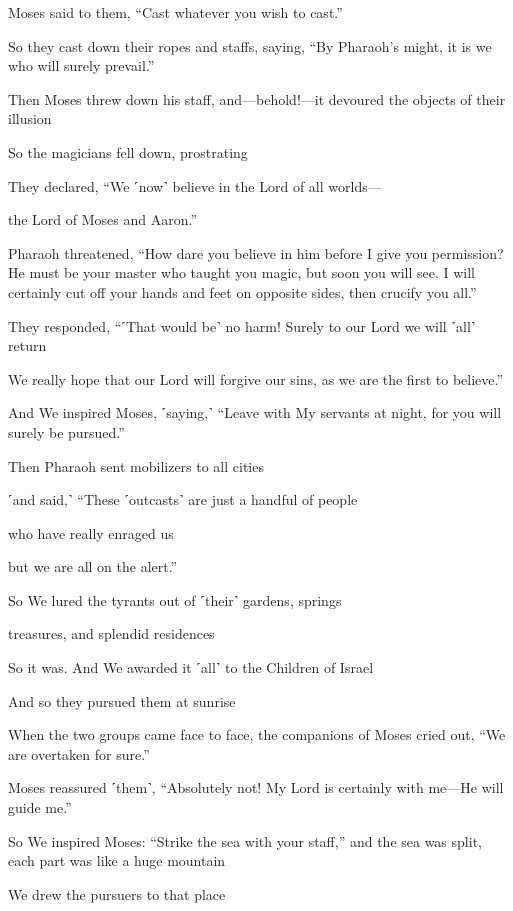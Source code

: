 Moses said to them, “Cast whatever you wish to cast.”

So they cast down their ropes and staffs, saying, “By Pharaoh’s might, it is we who will surely prevail.”

Then Moses threw down his staff, and—behold!—it devoured the objects of their illusion

So the magicians fell down, prostrating

They declared, “We ˹now˺ believe in the Lord of all worlds—

the Lord of Moses and Aaron.”

Pharaoh threatened, “How dare you believe in him before I give you permission? He must be your master who taught you magic, but soon you will see. I will certainly cut off your hands and feet on opposite sides, then crucify you all.”

They responded, “˹That would be˺ no harm! Surely to our Lord we will ˹all˺ return

We really hope that our Lord will forgive our sins, as we are the first to believe.”

And We inspired Moses, ˹saying,˺ “Leave with My servants at night, for you will surely be pursued.”

Then Pharaoh sent mobilizers to all cities

˹and said,˺ “These ˹outcasts˺ are just a handful of people

who have really enraged us

but we are all on the alert.”

So We lured the tyrants out of ˹their˺ gardens, springs

treasures, and splendid residences

So it was. And We awarded it ˹all˺ to the Children of Israel

And so they pursued them at sunrise

When the two groups came face to face, the companions of Moses cried out, “We are overtaken for sure.”

Moses reassured ˹them˺, “Absolutely not! My Lord is certainly with me—He will guide me.”

So We inspired Moses: “Strike the sea with your staff,” and the sea was split, each part was like a huge mountain

We drew the pursuers to that place

